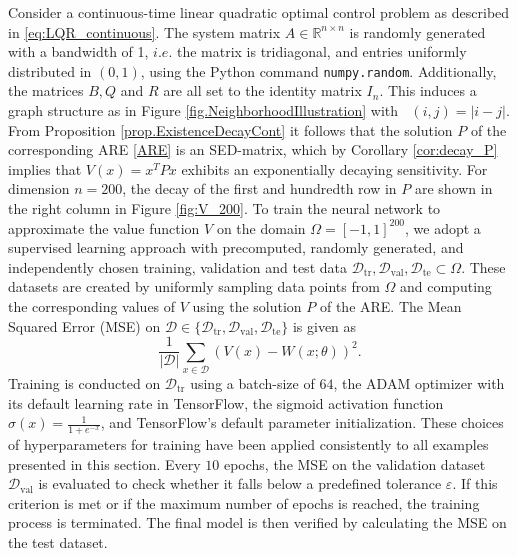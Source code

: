 \documentclass{article}
\newcommand{\R}{\mathbb{R}}
\newcommand{\Rnn}{\R^{n \times n}}
\DeclareMathOperator{\distG}{\operatorname{dist_\mathcal{G}}} %
\newcommand{\dataTrain}{\mathcal{D}_{\text{tr}}}
\newcommand{\dataVal}{\mathcal{D}_{\text{val}}}
\newcommand{\dataTest}{\mathcal{D}_{\text{te}}}
\newcommand{\cD}{\mathcal{D}}
\newcommand{\abs}[1]{\left\lvert {#1} \right\rvert}
\begin{document}
Consider a continuous-time linear quadratic optimal control problem as described in \eqref{eq:LQR_continuous}. The system matrix $A \in \Rnn$ is randomly generated with a bandwidth of 1, $i.e.$ the matrix is tridiagonal, and entries uniformly distributed in $(0,1)$, using the Python  command \texttt{numpy.random}. Additionally, the matrices $B,Q$ and $R$ are all set to the identity matrix $I_n$. This induces a graph structure as in Figure \ref{fig.NeighborhoodIllustration} with $\distG(i, j) = \abs{i-j}$. From Proposition \ref{prop.ExistenceDecayCont} it follows that the solution $P$ of the corresponding ARE \eqref{ARE} is an SED-matrix, which by Corollary \ref{cor:decay_P} implies that $V(x) = x^T P x $ exhibits an exponentially decaying sensitivity. For dimension $n = 200$, the decay of the first and hundredth row in $P$ are shown in the right column in Figure \ref{fig:V_200}. 
To train the neural network to approximate the value function $V$ on the domain $\Omega = [-1,1]^{200}$, we adopt a supervised learning approach with precomputed, randomly generated, and independently chosen training, validation and test data $\dataTrain, \dataVal, \dataTest \subset \Omega$. These datasets are created by uniformly sampling data points from $\Omega$ and computing the corresponding values of $V$ using the solution $P$ of the ARE. The Mean Squared Error (MSE) on $\cD \in \lbrace \dataTrain, \dataVal, \dataTest \rbrace$ is given as
\begin{equation} \label{eq:NN_ocp:MSE}
    \frac{1}{|\cD|} \sum_{x \in \cD} (V(x) - W(x; \theta))^2. 
\end{equation}
Training is conducted on $\dataTrain$ using a batch-size of $64$, the ADAM optimizer with its default learning rate in TensorFlow, the sigmoid activation function $\sigma(x) = \frac{1}{1 + e^{-x}}$, and TensorFlow’s default parameter initialization. These choices of hyperparameters for training have been applied consistently to all examples presented in this section. Every $10$ epochs, the MSE on the validation dataset $\dataVal$ is evaluated to check whether it falls below a predefined tolerance $\varepsilon$. If this criterion is met or if the maximum number of epochs is reached, the training process is terminated. The final model is then verified by calculating the MSE on the test dataset. 
\end{document}
